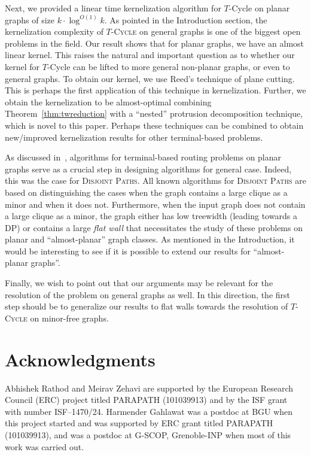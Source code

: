 \documentclass{article}
\numberwithin{claimcounter}{lemma}
\newcommand{\tcycle}{$T$-\textsc{Cycle}\xspace}
\begin{document}
 



Next, we provided a linear time kernelization algorithm for {\sc $T$-Cycle} on planar graphs of size $k\cdot \log^{O(1)}k$. As pointed in the Introduction section, the kernelization complexity of \tcycle on general graphs is one of the biggest open problems in the field. Our result shows that for planar graphs, we  have an almost linear kernel. This raises the natural and important question as to whether our kernel for {\sc $T$-Cycle} can be lifted to more general non-planar graphs, or even to general graphs. To obtain our kernel, we use  Reed's technique of plane cutting. This is perhaps the first application of this technique in kernelization. Further, we obtain the kernelization to be almost-optimal combining Theorem~\ref{thm:twreduction} with a ``nested'' protrusion decomposition technique, which is  novel to this paper. Perhaps these techniques can be combined to obtain new/improved kernelization results for other terminal-based problems. 

As discussed in~\cite{DBLP:conf/birthday/Lokshtanov0Z20}, algorithms for terminal-based routing problems on planar graphs serve as a crucial step in designing algorithms for general case. Indeed, this was the case for \textsc{Disjoint Paths}. All known algorithms for \textsc{Disjoint Paths} are based on distinguishing the cases when the graph contains a large clique as a minor and when it does not. Furthermore, when the input graph does not contain a large clique as a minor, the graph either has  low treewidth (leading towards a DP) or contains a large \textit{flat wall} that necessitates the study of these problems on planar and ``almost-planar'' graph classes.  As mentioned in the Introduction, it would be interesting  to see if it is possible to extend our results for ``almost-planar graphs''. 


Finally, we wish to point out that our arguments may be relevant for the resolution of the problem on general graphs as well. In this direction, the first step should be to generalize our results to flat walls towards the resolution of \tcycle on minor-free graphs. 






\section*{Acknowledgments}
Abhishek Rathod and Meirav Zehavi are supported by the European Research Council (ERC) project titled PARAPATH (101039913) and by the ISF grant with number ISF--1470/24. Harmender Gahlawat was a postdoc at BGU when this project started and was supported by ERC grant titled PARAPATH (101039913), and was a postdoc at G-SCOP, Grenoble-INP when most of this work was carried out.


 






\newpage
\appendix
\end{document}
